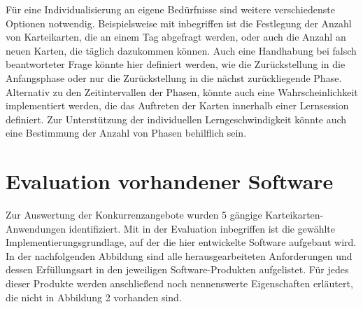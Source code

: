 Für eine Individualisierung an eigene Bedürfnisse sind weitere verschiedenste Optionen notwendig. Beispielsweise mit inbegriffen ist die Festlegung der Anzahl von Karteikarten, die an einem Tag abgefragt werden, oder auch die Anzahl an neuen Karten, die täglich dazukommen können. Auch eine Handhabung bei falsch beantworteter Frage könnte hier definiert werden, wie die Zurückstellung in die Anfangsphase oder nur die Zurückstellung in die nächst zurückliegende Phase. Alternativ zu den Zeitintervallen der Phasen, könnte auch eine Wahrscheinlichkeit implementiert werden, die das Auftreten der Karten innerhalb einer Lernsession definiert. Zur Unterstützung der individuellen Lerngeschwindigkeit könnte auch eine Bestimmung der Anzahl von Phasen behilflich sein. 



\section{Evaluation vorhandener Software}
Zur Auswertung der Konkurrenzangebote wurden 5 gängige Karteikarten-Anwendungen identifiziert. Mit in der Evaluation inbegriffen ist die gewählte Implementierungsgrundlage, auf der die hier entwickelte Software aufgebaut wird. In der nachfolgenden Abbildung sind alle herausgearbeiteten Anforderungen und dessen Erfüllungsart in den jeweiligen Software-Produkten aufgelistet. Für jedes dieser Produkte werden anschließend noch nennenswerte Eigenschaften erläutert, die nicht in Abbildung 2 vorhanden sind.

